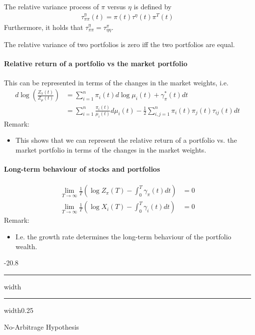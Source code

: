 \documentclass[a4paper,landscape,8pt,fleqn]{scrartcl}
\makeatletter
\renewcommand{\subsection}{\@startsection{subsection}{1}{0mm}%
{-2\baselineskip}{0.8\baselineskip}%
{\hrule depth 0.2pt width\columnwidth\hrule depth0.75pt
width0.25\columnwidth\vspace*{1.2em}\large\bfseries}}
\makeatother
\begin{document}
\begin{multicols*}{3}
The relative variance process of $\pi$ versus $\eta$ is defined by
\begin{align*}
\tau_{\pi \pi}^\eta(t) = \pi(t) \tau^\eta(t) \pi^T(t)
\end{align*}
Furthermore, it holds that $\tau_{\pi \pi}^\eta = \tau_{\eta \eta}^\pi$.

The relative variance of two portfolios is zero iff the two portfolios are equal.

\paragraph{Relative return of a portfolio vs the market portfolio}

This can be represented in terms of the changes in the market weights, i.e.
\begin{align*}
d \log \left( \frac{Z_\pi(t)}{Z_\mu(t)} \right) &= \sum_{i=1}^n \pi_i(t) d \log \mu_i(t) + \gamma_\pi^\ast(t) dt \\
&= \sum_{i=1}^n \frac{\pi_i(t)}{\mu_i(t)} d\mu_i(t) - \frac{1}{2} \sum_{i,j=1}^n \pi_i(t) \pi_j(t) \tau_{ij}(t) dt
\end{align*}
Remark:
\begin{itemize}
\item This shows that we can represent the relative return of a portfolio vs. the market portfolio in terms of the changes in the market weights.
\end{itemize}

\paragraph{Long-term behaviour of stocks and portfolios}

\begin{align*}
\lim\limits_{T \rightarrow \infty} \frac{1}{T} \left( \log Z_\pi(T) - \int_0^T \gamma_\pi(t) dt \right) &= 0 \\
\lim\limits_{T \rightarrow \infty} \frac{1}{T} \left( \log X_i(T) - \int_0^T \gamma_i(t) dt \right) &= 0
\end{align*}
Remark:
\begin{itemize}
\item I.e. the growth rate determines the long-term behaviour of the portfolio wealth.
\end{itemize}

\subsection{No-Arbitrage Hypothesis}


\end{multicols*}
\end{document}
